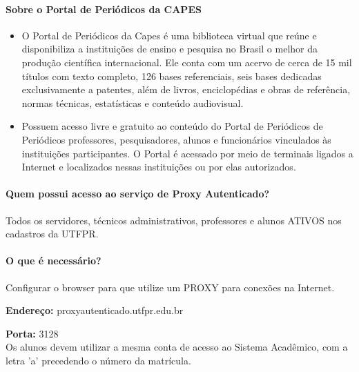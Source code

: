\documentclass[a4paper,12pt,openany]{article}
\begin{document}
\paragraph{Sobre o Portal de Periódicos da CAPES}

\begin{itemize}

\item O Portal de Periódicos da Capes é uma biblioteca virtual que reúne e disponibiliza a instituições de ensino e pesquisa no Brasil o melhor da produção científica internacional. Ele conta com um acervo de cerca de 15 mil títulos com texto completo, 126 bases referenciais, seis bases dedicadas exclusivamente a patentes, além de livros, enciclopédias e obras de referência, normas técnicas, estatísticas e conteúdo audiovisual.

\item Possuem acesso livre e gratuito ao conteúdo do Portal de Periódicos de Periódicos professores, pesquisadores, alunos e funcionários vinculados às instituições participantes. O Portal é acessado por meio de terminais ligados a Internet e localizados nessas instituições ou por elas autorizados.

\end{itemize}

\paragraph{Quem possui acesso ao serviço de Proxy Autenticado?\\}

Todos os servidores, técnicos administrativos, professores e alunos ATIVOS nos cadastros da UTFPR.

\paragraph{O que é necessário?\\}

Configurar o browser para que utilize um PROXY para conexões na Internet.

\textbf{Endereço:} proxyautenticado.utfpr.edu.br

\textbf{Porta:} 3128\\[6pt]

Os alunos devem utilizar a mesma conta de acesso ao Sistema Acadêmico, com a letra 'a' precedendo o número da matrícula.


\newpage
\end{document}
